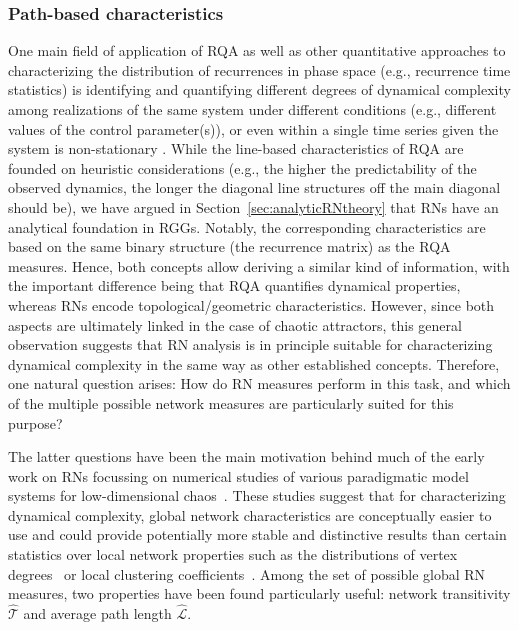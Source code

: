 		\subsubsection{Path-based characteristics}\label{sec:apl}
		One main field of application of RQA as well as other quantitative approaches to characterizing the distribution of recurrences in phase space (e.g., recurrence time statistics) is identifying and quantifying different degrees of dynamical complexity among realizations of the same system under different conditions (e.g., different values of the control parameter(s)), or even within a single time series given the system is non-stationary \cite{marwan2007}. While the line-based characteristics of RQA are founded on heuristic considerations (e.g., the higher the predictability of the observed dynamics, the longer the diagonal line structures off the main diagonal should be), we have argued in Section~\ref{sec:analyticRNtheory} that RNs have an analytical foundation in RGGs. Notably, the corresponding characteristics are based on the same binary structure (the recurrence matrix) as the RQA measures. Hence, both concepts allow deriving a similar kind of information, with the important difference being that RQA quantifies dynamical properties, whereas RNs encode topological/geometric characteristics. However, since both aspects are ultimately linked in the case of chaotic attractors, this general observation suggests that RN analysis is in principle suitable for characterizing dynamical complexity in the same way as other established concepts. Therefore, one natural question arises: How do RN measures perform in this task, and which of the multiple possible network measures are particularly suited for this purpose?

		The latter questions have been the main motivation behind much of the early work on RNs focussing on numerical studies of various paradigmatic model systems for low-dimensional chaos~\cite{Donner2010Nolta,Donner2011,Donner2010b,Donner2010a,Marwan2009,Zou2010,Zou2012c}. These studies suggest that for characterizing dynamical complexity, global network characteristics are conceptually easier to use and could provide potentially more stable and distinctive results than certain statistics over local network properties such as the distributions of vertex degrees~\cite{Zou2012b} or local clustering coefficients~\cite{Zou2012c}. Among the set of possible global RN measures, two properties have been found particularly useful: network transitivity $\hat{\mathcal{T}}$ and average path length $\hat{\mathcal{L}}$.

